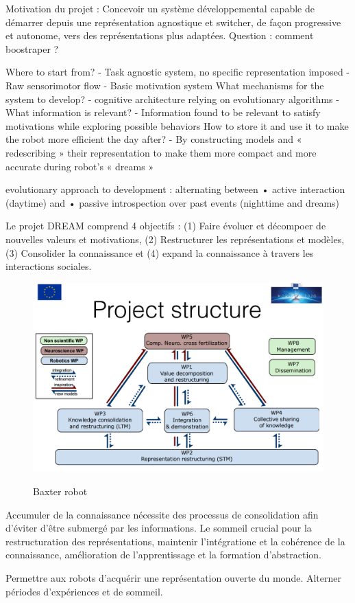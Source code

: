 \documentclass{llncs}
\begin{document}
Motivation du projet : Concevoir un système développemental capable de démarrer depuis une représentation agnostique et switcher, de façon progressive et autonome, vers des représentations plus adaptées. Question : comment boostraper ?

Where to start from?
- Task agnostic system, no specific representation imposed
- Raw sensorimotor flow
- Basic motivation system
What mechanisms for the system to develop?
- cognitive architecture relying on evolutionary algorithms
- What information is relevant?
- Information found to be relevant to satisfy motivations while exploring
possible behaviors
How to store it and use it to make the robot more efficient the day after?
- By constructing models and « redescribing » their representation to make
them more compact and more accurate during robot’s « dreams »

evolutionary approach to
development : alternating between
• active interaction (daytime) and
• passive introspection over past
events (nighttime and dreams)

Le projet DREAM comprend 4 objectifs : (1) Faire évoluer et décompoer de nouvelles valeurs et motivations, (2) Restructurer les représentations et modèles, (3) Consolider la connaissance et (4) expand la connaissance à travers les interactions sociales.

\begin{figure}
	\centering
	\includegraphics[angle=-90,width=.5\textwidth]{figures/project_structure.png}
	\label{fig:baxter}
	\caption{Baxter robot}
\end{figure}

Accumuler de la connaissance nécessite des processus de consolidation afin d'éviter d'être submergé par les informations. Le sommeil crucial pour la restructuration des représentations, maintenir l'intégratione et la cohérence de la connaissance, amélioration de l'apprentissage et la formation d'abstraction.

Permettre aux robots d'acquérir une représentation ouverte du monde. Alterner périodes d'expériences et de sommeil.
\end{document}
